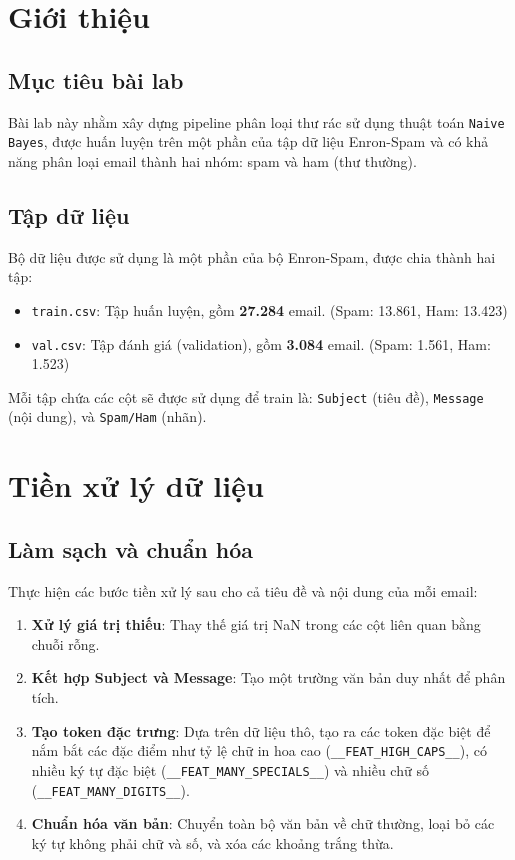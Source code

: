 \section{Giới thiệu}

\subsection{Mục tiêu bài lab}
Bài lab này nhằm xây dựng pipeline phân loại thư rác sử dụng thuật toán \texttt{Naive Bayes}, được huấn luyện trên một phần của tập dữ liệu Enron-Spam và có khả năng phân loại email thành hai nhóm: spam và ham (thư thường).

\subsection{Tập dữ liệu}
Bộ dữ liệu được sử dụng là một phần của bộ Enron-Spam, được chia thành hai tập:
\begin{itemize}
    \item \texttt{train.csv}: Tập huấn luyện, gồm \textbf{27.284} email. (Spam: 13.861, Ham: 13.423)
    \item \texttt{val.csv}: Tập đánh giá (validation), gồm \textbf{3.084} email. (Spam: 1.561, Ham: 1.523)
\end{itemize}
Mỗi tập chứa các cột sẽ được sử dụng để train là: \texttt{Subject} (tiêu đề), \texttt{Message} (nội dung), và \texttt{Spam/Ham} (nhãn).

\section{Tiền xử lý dữ liệu}

\subsection{Làm sạch và chuẩn hóa}
Thực hiện các bước tiền xử lý sau cho cả tiêu đề và nội dung của mỗi email:

\begin{enumerate}
    \item \textbf{Xử lý giá trị thiếu}: Thay thế giá trị NaN trong các cột liên quan bằng chuỗi rỗng.
    \item \textbf{Kết hợp Subject và Message}: Tạo một trường văn bản duy nhất để phân tích.
    \item \textbf{Tạo token đặc trưng}: Dựa trên dữ liệu thô, tạo ra các token đặc biệt để nắm bắt các đặc điểm như tỷ lệ chữ in hoa cao (\texttt{\_\_FEAT\_HIGH\_CAPS\_\_}), có nhiều ký tự đặc biệt (\texttt{\_\_FEAT\_MANY\_SPECIALS\_\_}) và nhiều chữ số (\texttt{\_\_FEAT\_MANY\_DIGITS\_\_}).
    \item \textbf{Chuẩn hóa văn bản}: Chuyển toàn bộ văn bản về chữ thường, loại bỏ các ký tự không phải chữ và số, và xóa các khoảng trắng thừa.
\end{enumerate}

